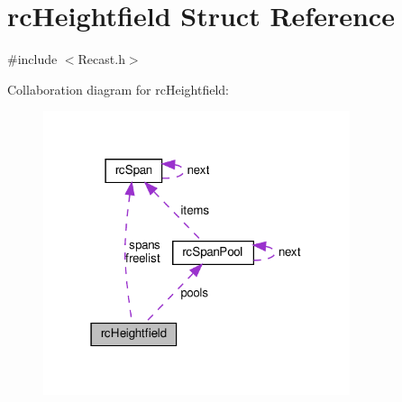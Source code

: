 \hypertarget{structrcHeightfield}{}\section{rc\+Heightfield Struct Reference}
\label{structrcHeightfield}


{\ttfamily \#include $<$Recast.\+h$>$}



Collaboration diagram for rc\+Heightfield\+:
\nopagebreak
\begin{figure}[H]
\begin{center}
\leavevmode
\includegraphics[width=255pt]{structrcHeightfield__coll__graph}
\end{center}
\end{figure}
